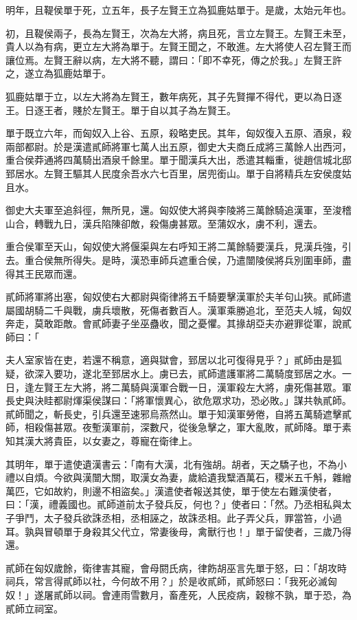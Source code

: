 \begin{pinyinscope}
明年，且鞮侯單于死，立五年，長子左賢王立為狐鹿姑單于。是歲，太始元年也。

初，且鞮侯兩子，長為左賢王，次為左大將，病且死，言立左賢王。左賢王未至，貴人以為有病，更立左大將為單于。左賢王聞之，不敢進。左大將使人召左賢王而讓位焉。左賢王辭以病，左大將不聽，謂曰：「即不幸死，傳之於我。」左賢王許之，遂立為狐鹿姑單于。

狐鹿姑單于立，以左大將為左賢王，數年病死，其子先賢撣不得代，更以為日逐王。日逐王者，賤於左賢王。單于自以其子為左賢王。

單于既立六年，而匈奴入上谷、五原，殺略吏民。其年，匈奴復入五原、酒泉，殺兩部都尉。於是漢遣貳師將軍七萬人出五原，御史大夫商丘成將三萬餘人出西河，重合侯莽通將四萬騎出酒泉千餘里。單于聞漢兵大出，悉遣其輜重，徙趙信城北邸郅居水。左賢王驅其人民度余吾水六七百里，居兜銜山。單于自將精兵左安侯度姑且水。

御史大夫軍至追斜徑，無所見，還。匈奴使大將與李陵將三萬餘騎追漢軍，至浚稽山合，轉戰九日，漢兵陷陳卻敵，殺傷虜甚眾。至蒲奴水，虜不利，還去。

重合侯軍至天山，匈奴使大將偃渠與左右呼知王將二萬餘騎要漢兵，見漢兵強，引去。重合侯無所得失。是時，漢恐車師兵遮重合侯，乃遣闓陵侯將兵別圍車師，盡得其王民眾而還。

貳師將軍將出塞，匈奴使右大都尉與衛律將五千騎要擊漢軍於夫羊句山狹。貳師遣屬國胡騎二千與戰，虜兵壞散，死傷者數百人。漢軍乘勝追北，至范夫人城，匈奴奔走，莫敢距敵。會貳師妻子坐巫蠱收，聞之憂懼。其掾胡亞夫亦避罪從軍，說貳師曰：「

夫人室家皆在吏，若還不稱意，適與獄會，郅居以北可復得見乎？」貳師由是狐疑，欲深入要功，遂北至郅居水上。虜已去，貳師遣護軍將二萬騎度郅居之水。一日，逢左賢王左大將，將二萬騎與漢軍合戰一日，漢軍殺左大將，虜死傷甚眾。軍長史與決眭都尉煇渠侯謀曰：「將軍懷異心，欲危眾求功，恐必敗。」謀共執貳師。貳師聞之，斬長史，引兵還至速邪烏燕然山。單于知漢軍勞倦，自將五萬騎遮擊貳師，相殺傷甚眾。夜塹漢軍前，深數尺，從後急擊之，軍大亂敗，貳師降。單于素知其漢大將貴臣，以女妻之，尊寵在衛律上。

其明年，單于遣使遺漢書云：「南有大漢，北有強胡。胡者，天之驕子也，不為小禮以自煩。今欲與漢闓大關，取漢女為妻，歲給遺我糱酒萬石，稷米五千斛，雜繒萬匹，它如故約，則邊不相盜矣。」漢遣使者報送其使，單于使左右難漢使者，曰：「漢，禮義國也。貳師道前太子發兵反，何也？」使者曰：「然。乃丞相私與太子爭鬥，太子發兵欲誅丞相，丞相誣之，故誅丞相。此子弄父兵，罪當笞，小過耳。孰與冒頓單于身殺其父代立，常妻後母，禽獸行也！」單于留使者，三歲乃得還。

貳師在匈奴歲餘，衛律害其寵，會母閼氏病，律飭胡巫言先單于怒，曰：「胡攻時祠兵，常言得貳師以社，今何故不用？」於是收貳師，貳師怒曰：「我死必滅匈奴！」遂屠貳師以祠。會連雨雪數月，畜產死，人民疫病，穀稼不孰，單于恐，為貳師立祠室。


\end{pinyinscope}
